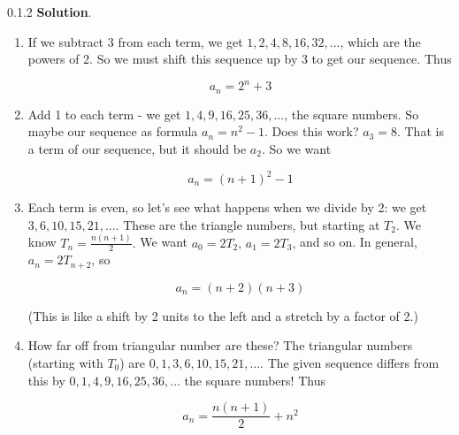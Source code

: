 \documentclass[11pt,]{book}
\theoremstyle{ptxplainnotitle}
\theoremstyle{ptxplaintitle}
\theoremstyle{ptxdefinitionnotitle}
\theoremstyle{ptxdefinitiontitle}
\theoremstyle{ptxdefinitionnotitle}
\theoremstyle{ptxdefinitiontitle}
\theoremstyle{ptxdefinitionnotitle}
\theoremstyle{ptxdefinitiontitle}
\theoremstyle{ptxdefinitiontitlenonumber}
\theoremstyle{ptxdefinitiontitlenonumber}
\numberwithin{equation}{chapter}
\begin{document}
\begin{divisionexercise}{0.1.2}
\textbf{Solution}.\quad%
\hypertarget{p-111}{}%
\leavevmode%
\begin{enumerate}[label=\alph*.]
\item\hypertarget{li-78}{}\hypertarget{p-112}{}%
If we subtract 3 from each term, we get \(1, 2, 4, 8, 16, 32, \ldots\text{,}\) which are the powers of 2. So we must shift this sequence up by 3 to get our sequence. Thus%
\par
\hypertarget{p-113}{}%
%
\begin{equation*}
a_n = 2^n + 3
\end{equation*}
%
\item\hypertarget{li-79}{}\hypertarget{p-114}{}%
Add 1 to each term - we get \(1, 4, 9, 16, 25, 36, \ldots\text{,}\) the square numbers. So maybe our sequence as formula \(a_n = n^2 - 1\text{.}\) Does this work? \(a_3 = 8\text{.}\) That is a term of our sequence, but it should be \(a_2\text{.}\) So we want%
\par
\hypertarget{p-115}{}%
%
\begin{equation*}
a_n = (n+1)^2 - 1
\end{equation*}
%
\item\hypertarget{li-80}{}\hypertarget{p-116}{}%
Each term is even, so let's see what happens when we divide by 2: we get \(3, 6, 10, 15, 21,\ldots\text{.}\) These are the triangle numbers, but starting at \(T_2\text{.}\) We know \(T_n = \frac{n(n+1)}{2}\text{.}\) We want \(a_0 = 2T_2\text{,}\) \(a_1 = 2T_3\text{,}\) and so on. In general, \(a_n = 2T_{n+2}\text{,}\) so%
\par
\hypertarget{p-117}{}%
%
\begin{equation*}
a_n = (n+2)(n+3)
\end{equation*}
%
\par
\hypertarget{p-118}{}%
(This is like a shift by 2 units to the left and a stretch by a factor of 2.)%
\item\hypertarget{li-81}{}\hypertarget{p-119}{}%
How far off from triangular number are these? The triangular numbers (starting with \(T_0\)) are \(0, 1, 3, 6, 10, 15, 21, \ldots\text{.}\) The given sequence differs from this by \(0, 1, 4, 9, 16, 25, 36, \ldots\) the square numbers! Thus%
\par
\hypertarget{p-120}{}%
%
\begin{equation*}
a_n = \frac{n(n+1)}{2} + n^2
\end{equation*}
%
\end{enumerate}
%
\end{divisionexercise}%
\end{document}
